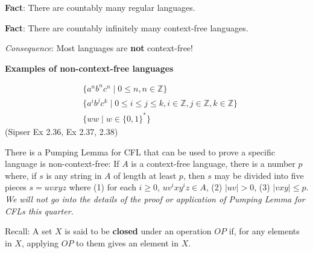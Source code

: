 \documentclass[12pt, oneside]{article}
\begin{document}
\vfill

{\bf Fact}: There are countably many regular languages.

\vfill

{\bf Fact}: There are countably infinitely many context-free languages.

\vfill

{\it Consequence}: Most languages are {\bf not} context-free!

\vfill

\newpage
{\bf Examples  of non-context-free languages}

\begin{align*}
    &\{ a^n b^n c^n \mid 0 \leq n , n \in \mathbb{Z}\}\\
    &\{ a^i b^j c^k \mid 0 \leq i \leq j \leq k , i \in \mathbb{Z}, j \in \mathbb{Z}, k \in \mathbb{Z}\}\\
    &\{ ww \mid w \in \{0,1\}^* \}
\end{align*}
(Sipser Ex 2.36, Ex 2.37, 2.38)

There is a Pumping Lemma for CFL that can be used to prove a specific language is non-context-free: 
If $A$ is a context-free language, there
is a number $p$ where, if $s$ is any string in $A$ of length at least $p$, then $s$ may be divided 
into five pieces $s = uvxyz$ where (1) for each $i \geq 0$, $uv^ixy^iz \in A$, (2) $|uv|>0$, (3) $|vxy| \leq p$.
{\it We will not go into the details of the proof or application of Pumping Lemma for CFLs this quarter.}


Recall: A set $X$ is said to be {\bf closed} under an operation $OP$ if, for any elements in $X$, applying 
$OP$ to them gives an element in $X$.  
\end{document}
